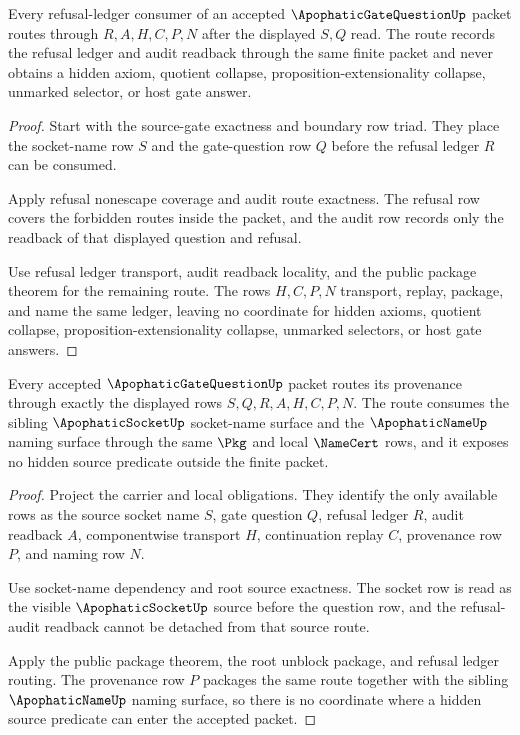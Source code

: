 \begin{theorem}
\label{thm:apophatic-gate-question-refusal-ledger-routing}
Every refusal-ledger consumer of an accepted $\ApophaticGateQuestionUp$ packet routes through $R,A,H,C,P,N$ after the displayed $S,Q$ read. The route records the refusal ledger and audit readback through the same finite packet and never obtains a hidden axiom, quotient collapse, proposition-extensionality collapse, unmarked selector, or host gate answer.
\end{theorem}
\begin{proof}
Start with the source-gate exactness and boundary row triad. They place the socket-name row $S$ and the gate-question row $Q$ before the refusal ledger $R$ can be consumed.

Apply refusal nonescape coverage and audit route exactness. The refusal row covers the forbidden routes inside the packet, and the audit row records only the readback of that displayed question and refusal.

Use refusal ledger transport, audit readback locality, and the public package theorem for the remaining route. The rows $H,C,P,N$ transport, replay, package, and name the same ledger, leaving no coordinate for hidden axioms, quotient collapse, proposition-extensionality collapse, unmarked selectors, or host gate answers.
\end{proof}

\begin{theorem}
\label{thm:apophatic-gate-question-provenance-route-exhaustion}
Every accepted $\ApophaticGateQuestionUp$ packet routes its provenance through exactly the displayed rows $S,Q,R,A,H,C,P,N$. The route consumes the sibling $\ApophaticSocketUp$ socket-name surface and the $\ApophaticNameUp$ naming surface through the same $\Pkg$ and local $\NameCert$ rows, and it exposes no hidden source predicate outside the finite packet.
\end{theorem}
\begin{proof}
Project the carrier and local \NameCert{} obligations. They identify the only available rows as the source socket name $S$, gate question $Q$, refusal ledger $R$, audit readback $A$, componentwise transport $H$, continuation replay $C$, provenance row $P$, and naming row $N$.

Use socket-name dependency and root source exactness. The socket row is read as the visible $\ApophaticSocketUp$ source before the question row, and the refusal-audit readback cannot be detached from that source route.

Apply the public package theorem, the root unblock package, and refusal ledger routing. The provenance row $P$ packages the same route together with the sibling $\ApophaticNameUp$ naming surface, so there is no coordinate where a hidden source predicate can enter the accepted packet.
\end{proof}

